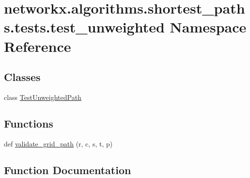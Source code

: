 \hypertarget{namespacenetworkx_1_1algorithms_1_1shortest__paths_1_1tests_1_1test__unweighted}{}\section{networkx.\+algorithms.\+shortest\+\_\+paths.\+tests.\+test\+\_\+unweighted Namespace Reference}
\label{namespacenetworkx_1_1algorithms_1_1shortest__paths_1_1tests_1_1test__unweighted}
\subsection*{Classes}
\begin{DoxyCompactItemize}
\item 
class \hyperlink{classnetworkx_1_1algorithms_1_1shortest__paths_1_1tests_1_1test__unweighted_1_1TestUnweightedPath}{Test\+Unweighted\+Path}
\end{DoxyCompactItemize}
\subsection*{Functions}
\begin{DoxyCompactItemize}
\item 
def \hyperlink{namespacenetworkx_1_1algorithms_1_1shortest__paths_1_1tests_1_1test__unweighted_a9d64f3ca8326cd6b3ff8ef77c5f5164e}{validate\+\_\+grid\+\_\+path} (r, c, s, t, p)
\end{DoxyCompactItemize}


\subsection{Function Documentation}
\mbox{\label{namespacenetworkx_1_1algorithms_1_1shortest__paths_1_1tests_1_1test__unweighted_a9d64f3ca8326cd6b3ff8ef77c5f5164e}} 
